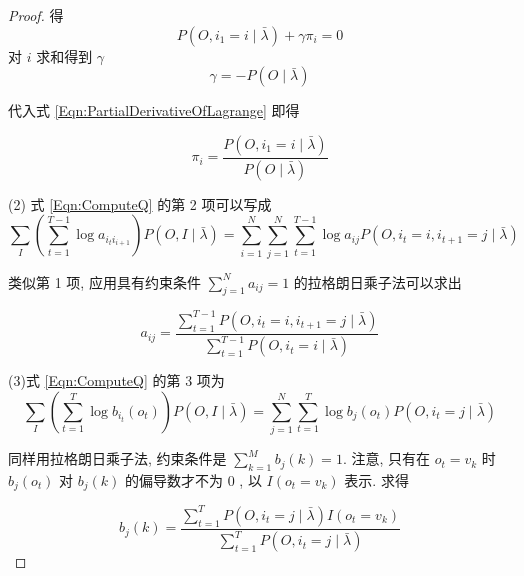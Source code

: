 \begin{proof}
得
$$
P\left(O, i_{1}=i \mid \bar{\lambda}\right)+\gamma \pi_{i}=0
$$
对 $ i $ 求和得到 $ \gamma $
$$
\gamma=-P(O \mid \bar{\lambda})
$$

代入式 \ref{Eqn:PartialDerivativeOfLagrange}  即得

\begin{equation}
    \label{Eqn:ComputePI}
\pi_{i}=\frac{P\left(O, i_{1}=i \mid \bar{\lambda}\right)}{P(O \mid \bar{\lambda})}
\end{equation}



(2) 式 \ref{Eqn:ComputeQ} 的第 2 项可以写成
$$
\sum_{I}\left(\sum_{t=1}^{T-1} \log a_{i_t i_{i+1}}\right) P(O, I \mid \bar{\lambda})=\sum_{i=1}^{N} \sum_{j=1}^{N} \sum_{t=1}^{T-1} \log a_{i j} P\left(O, i_{t}=i, i_{t+1}=j \mid \bar{\lambda}\right)
$$

类似第 1 项, 应用具有约束条件 $ \sum_{j=1}^{N} a_{i j}=1 $ 的拉格朗日乘子法可以求出

\begin{equation}
    \label{Eqn:ComputeA}
a_{i j}=\frac{\sum_{t=1}^{T-1} P\left(O, i_{t}=i, i_{t+1}=j \mid \bar{\lambda}\right)}{\sum_{t=1}^{T-1} P\left(O, i_{t}=i \mid \bar{\lambda}\right)} 
\end{equation}




(3)式 \ref{Eqn:ComputeQ} 的第 3 项为
$$
\sum_{I}\left(\sum_{t=1}^{T} \log b_{i_{t}}\left(o_{t}\right)\right) P(O, I \mid \bar{\lambda})=\sum_{j=1}^{N} \sum_{t=1}^{T} \log b_{j}\left(o_{t}\right) P\left(O, i_{t}=j \mid \bar{\lambda}\right)
$$

同样用拉格朗日乘子法, 约束条件是 $ \sum_{k=1}^{M} b_{j}(k)=1 $. 注意, 只有在 $ o_{t}=v_{k} $ 时 $ b_{j}\left(o_{t}\right) $ 对 $ b_{j}(k) $ 的偏导数才不为 0 , 以 $ I\left(o_{t}=v_{k}\right) $ 表示. 求得

\begin{equation}
    \label{Eqn:ComputeB}
 b_{j}(k)=\frac{\sum_{t=1}^{T} P\left(O, i_{t}=j \mid \bar{\lambda}\right) I\left(o_{t}=v_{k}\right)}{\sum_{t=1}^{T} P\left(O, i_{t}=j \mid \bar{\lambda}\right)}
\end{equation}
 

\end{proof}


